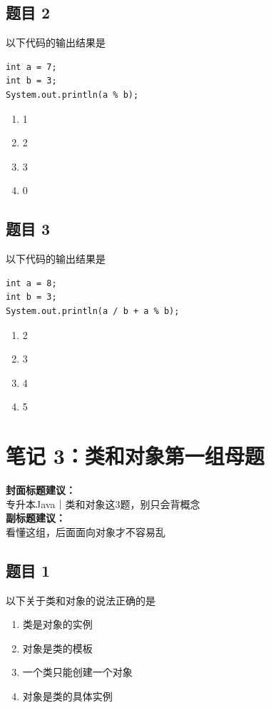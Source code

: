 \documentclass[12pt,a4paper]{ctexart}
\begin{document}
\subsection*{题目 2}
以下代码的输出结果是
\begin{lstlisting}
int a = 7;
int b = 3;
System.out.println(a % b);
\end{lstlisting}

\begin{enumerate}[label=\Alph*.]
    \item 1
    \item 2
    \item 3
    \item 0
\end{enumerate}

\subsection*{题目 3}
以下代码的输出结果是
\begin{lstlisting}
int a = 8;
int b = 3;
System.out.println(a / b + a % b);
\end{lstlisting}

\begin{enumerate}[label=\Alph*.]
    \item 2
    \item 3
    \item 4
    \item 5
\end{enumerate}

\newpage

\section{笔记 3：类和对象第一组母题}
\begin{coverbox}
\textbf{封面标题建议：}\\
专升本Java｜类和对象这3题，别只会背概念\\
\textbf{副标题建议：}\\
看懂这组，后面面向对象才不容易乱
\end{coverbox}

\subsection*{题目 1}
以下关于类和对象的说法正确的是
\begin{enumerate}[label=\Alph*.]
    \item 类是对象的实例
    \item 对象是类的模板
    \item 一个类只能创建一个对象
    \item 对象是类的具体实例
\end{enumerate}
\end{document}
